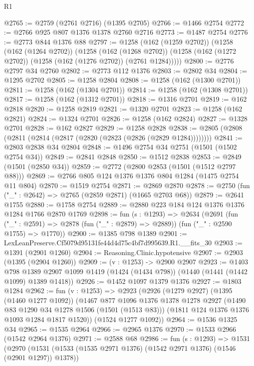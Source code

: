 \begin{lexlean}{R1}
\begin{coremodule}
@2765 := @2759 (@2761 @2716) (@1395 @2705)
@2766 := @1466 @2754
@2772 := @2766 @925 @807 @1376 @1378 @2760 @2716
@2773 := @1487 @2754
@2776 := @2773 @844 @1376 @88
@2797 := @1258
    (@162 (@1259 @2702))
    (@1258
      (@162 (@1264 @2702))
      (@1258
        (@162 (@1268 @2702))
        (@1258 (@162 (@1272 @2702)) (@1258 (@162 (@1276 @2702)) (@2761 @1284)))))
@2800 := @2776 @2797 @34 @2760
@2802 := @2773 @112 @1376
@2803 := @2802 @34
@2804 := @1295 @2702
@2805 := @1258 @2804
@2808 := @1258 (@162 (@1300 @2701))
@2811 := @1258 (@162 (@1304 @2701))
@2814 := @1258 (@162 (@1308 @2701))
@2817 := @1258 (@162 (@1312 @2701))
@2818 := @1316 @2701
@2819 := @162 @2818
@2820 := @1258 @2819
@2821 := @1320 @2701
@2823 := @1258 (@162 @2821)
@2824 := @1324 @2701
@2826 := @1258 (@162 @2824)
@2827 := @1328 @2701
@2828 := @162 @2827
@2829 := @1258 @2828
@2838 := @2805 (@2808 (@2811 (@2814 (@2817 (@2820 (@2823 (@2826 (@2829 @1284))))))))
@2841 := @2803 @2838 @34 @2804
@2848 := @1496 @2754 @34 @2751 (@1501 (@1502 @2754 @34))
@2849 := @2841 @2848
@2850 := @1512 @2838
@2853 := @2849 (@1501 (@2850 @34))
@2859 := @2772 (@2800 @2853 (@1501 (@1512 @2797 @88)))
@2869 := @2766 @805 @124 @1376 @1376 @804 @1284 (@1475 @2754 @11 @804)
@2870 := @1519 @2754
@2871 := @2869 @2870
@2878 := @2750 (fun ("_" : @2642) => @2765 (@2859 @2871) (@1665 @2703 @68))
@2879 := @2641 @1755
@2880 := @1758 @2754
@2889 := @2880 @223 @184 @124 @1376 @1376 @1284 @1766 @2870 @1769
@2898 := fun (s : @1293) =>
  @2634
    (@2691
      (fun ("_" : @2591) => @2878 (fun ("_" : @2879) => @2889))
      (fun ("_" : @2590 @1755) => @1770))
@2900 := @1385 @798 @1389
@2901 := LexLeanPreserve.Cf5079d95131fe44d4d75c4bf7d995639.R1.__fits_30
@2903 := @1391 (@2901 @1260)
@2904 := Reasoning.Clinic.hypotensive
@2907 := @2903 (@1395 (@2904 @1260))
@2909 := (v : @1253) -> @2900 @2907
@2923 := @1403
    @798
    @1389
    @2907
    @1099
    @1419
    (@1424 (@1434 @798))
    (@1440 (@1441 (@1442 @1099) @1389 @1418))
@2926 := @1452 @1097 @1379 @1376
@2927 := @1803 @1284
@2962 := fun (v : @1253) =>
  @2923
    (@2926
      (@1279 @2927)
      (@1395 (@1460 @1277 @1092))
      (@1467
        @877
        @1096
        @1376
        @1378
        @1278
        @2927
        (@1490 @83 @1290 @34 @1278 @1506 (@1501 (@1513 @83)))
        (@1811 @124 @1376 @1376 @1093 @1284 @1817 @1520))
      (@1524 @1277 @1092))
@2964 := @1536 @1325 @34
@2965 := @1535 @2964
@2966 := @2965 @1376
@2970 := @1533 @2966 (@1542 @2964 @1376)
@2971 := @2588 @68
@2986 := fun (s : @1293) =>
  @1531
    (@2970
      (@1531 (@1533 (@1535 @2971 @1376) (@1542 @2971 @1376) (@1546 (@2901 @1297)) @1378))

\end{coremodule}
\end{lexlean}
